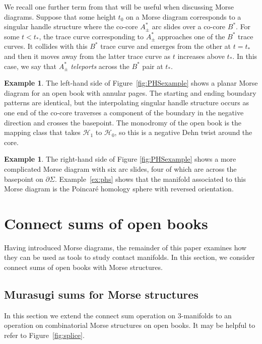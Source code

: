 \documentclass{amsart}
\theoremstyle{definition}
\newtheorem{example}[theorem]{Example}
\def\H{\mathcal{H}}
\begin{document}
We recall one further term from \cite{GL} that will be useful when discussing Morse diagrams.  Suppose that some height $t_0$ on a Morse diagram corresponds to a singular handle structure where the co-core $A^*_\pm$ arc slides over a co-core $B^*$.   For some $t<t_*$, the  trace curve corresponding to $A^*_\pm$ approaches one of the $B^*$ trace curves.  It collides with this $B^*$ trace curve and emerges from the other at  $t=t_*$ and then it moves away from the latter trace curve as $t$ increases above $t_*$.  In this case, we say that $A^*_\pm$ \textit{teleports} across the $B^*$ pair at $t_*$.  



\begin{example}
   
    
   The left-hand side of Figure~\ref{fig:PHSexample} shows a planar Morse diagram for an open book with annular pages.  The starting and ending boundary patterns are identical, but the interpolating singular handle structure occurs as one end of the co-core traverses a component of the boundary in the negative direction and crosses the basepoint.  The monodromy of the open book is the mapping class that takes $\H_1$ to $\H_0$, so this is a negative Dehn twist around the core.  
    
    
    \end{example}

    \begin{example}
   The right-hand side of Figure \ref{fig:PHSexample} shows a more complicated Morse diagram with six arc slides, four of which are across the basepoint on $\partial \Sigma$.   Example~\ref{ex:phs}  shows that the manifold associated to this Morse diagram is the Poincar\'{e} homology sphere with reversed orientation.  

\end{example}





\section{Connect sums of open books}\label{sec:sums}

Having introduced Morse diagrams, the remainder of this paper examines how they can be used as tools to study contact manifolds.  In this section, we consider connect sums of open books with Morse structures.  


\subsection{Murasugi sums for Morse structures}\label{sec:Murasugi}
In this section we  extend the connect sum operation on $3$-manifolds to an operation on combinatorial Morse structures on open books.  It may be helpful to refer to Figure~\ref{fig:splice}.  
\end{document}
